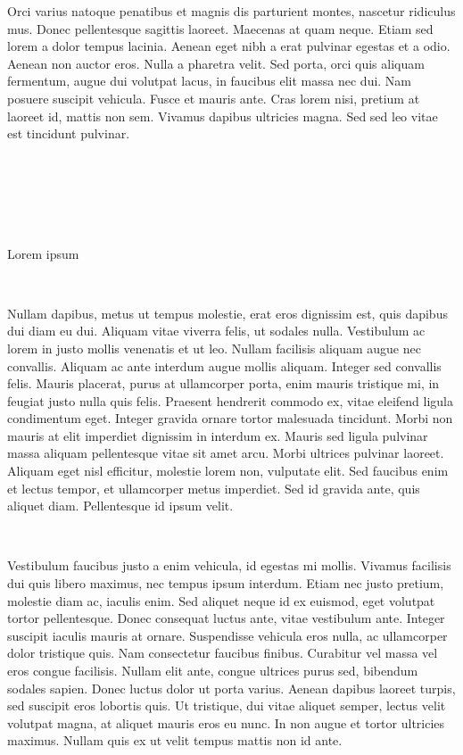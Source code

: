 \documentclass[
]{book}
\begin{document}
Orci varius natoque penatibus et magnis dis parturient montes, nascetur ridiculus mus. Donec pellentesque sagittis laoreet. Maecenas at quam neque. Etiam sed lorem a dolor tempus lacinia. Aenean eget nibh a erat pulvinar egestas et a odio. Aenean non auctor eros. Nulla a pharetra velit. Sed porta, orci quis aliquam fermentum, augue dui volutpat lacus, in faucibus elit massa nec dui. Nam posuere suscipit vehicula. Fusce et mauris ante. Cras lorem nisi, pretium at laoreet id, mattis non sem. Vivamus dapibus ultricies magna. Sed sed leo vitae est tincidunt pulvinar.

{~}

{~}

{~}

{Lorem ipsum}

{~}

Nullam dapibus, metus ut tempus molestie, erat eros dignissim est, quis dapibus dui diam eu dui. Aliquam vitae viverra felis, ut sodales nulla. Vestibulum ac lorem in justo mollis venenatis et ut leo. Nullam facilisis aliquam augue nec convallis. Aliquam ac ante interdum augue mollis aliquam. Integer sed convallis felis. Mauris placerat, purus at ullamcorper porta, enim mauris tristique mi, in feugiat justo nulla quis felis. Praesent hendrerit commodo ex, vitae eleifend ligula condimentum eget. Integer gravida ornare tortor malesuada tincidunt. Morbi non mauris at elit imperdiet dignissim in interdum ex. Mauris sed ligula pulvinar massa aliquam pellentesque vitae sit amet arcu. Morbi ultrices pulvinar laoreet. Aliquam eget nisl efficitur, molestie lorem non, vulputate elit. Sed faucibus enim et lectus tempor, et ullamcorper metus imperdiet. Sed id gravida ante, quis aliquet diam. Pellentesque id ipsum velit.

~

Vestibulum faucibus justo a enim vehicula, id egestas mi mollis. Vivamus facilisis dui quis libero maximus, nec tempus ipsum interdum. Etiam nec justo pretium, molestie diam ac, iaculis enim. Sed aliquet neque id ex euismod, eget volutpat tortor pellentesque. Donec consequat luctus ante, vitae vestibulum ante. Integer suscipit iaculis mauris at ornare. Suspendisse vehicula eros nulla, ac ullamcorper dolor tristique quis. Nam consectetur faucibus finibus. Curabitur vel massa vel eros congue facilisis. Nullam elit ante, congue ultrices purus sed, bibendum sodales sapien. Donec luctus dolor ut porta varius. Aenean dapibus laoreet turpis, sed suscipit eros lobortis quis. Ut tristique, dui vitae aliquet semper, lectus velit volutpat magna, at aliquet mauris eros eu nunc. In non augue et tortor ultricies maximus. Nullam quis ex ut velit tempus mattis non id ante.
\end{document}
